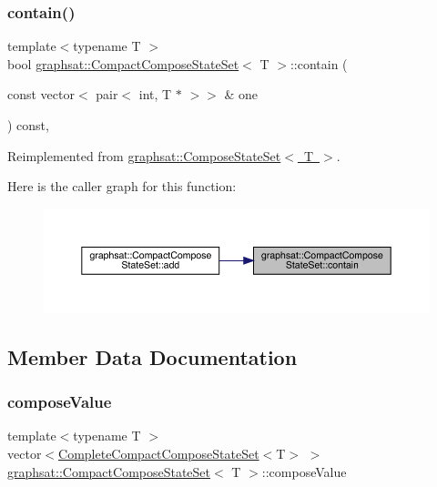 \subsubsection{\texorpdfstring{contain()}{contain()}}
{\footnotesize\ttfamily template$<$typename T $>$ \\
bool \mbox{\hyperlink{classgraphsat_1_1_compact_compose_state_set}{graphsat\+::\+Compact\+Compose\+State\+Set}}$<$ T $>$\+::contain (\begin{DoxyParamCaption}\item[{const vector$<$ pair$<$ int, T $\ast$ $>$$>$ \&}]{one }\end{DoxyParamCaption}) const\hspace{0.3cm}{\ttfamily [inline]}, {\ttfamily [virtual]}}



Reimplemented from \mbox{\hyperlink{classgraphsat_1_1_compose_state_set_abfd0e46ca8319f69a506b7854850782b}{graphsat\+::\+Compose\+State\+Set$<$ T $>$}}.

Here is the caller graph for this function\+:\nopagebreak
\begin{figure}[H]
\begin{center}
\leavevmode
\includegraphics[width=350pt]{classgraphsat_1_1_compact_compose_state_set_a0a42f9a9d01b52368209db0e1c5e67b7_icgraph}
\end{center}
\end{figure}


\subsection{Member Data Documentation}
\mbox{\label{classgraphsat_1_1_compact_compose_state_set_a1ae2638718a79420fee5bc46acbf38e3}} 
\subsubsection{\texorpdfstring{composeValue}{composeValue}}
{\footnotesize\ttfamily template$<$typename T $>$ \\
vector$<$\mbox{\hyperlink{classgraphsat_1_1_complete_compact_compose_state_set}{Complete\+Compact\+Compose\+State\+Set}}$<$T$>$ $>$ \mbox{\hyperlink{classgraphsat_1_1_compact_compose_state_set}{graphsat\+::\+Compact\+Compose\+State\+Set}}$<$ T $>$\+::compose\+Value\hspace{0.3cm}{\ttfamily [private]}}

